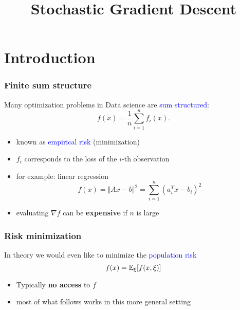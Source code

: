 \documentclass[aspectratio=149]{beamer}
\title{Stochastic Gradient Descent}
\begin{document}
\maketitle
{}

\section{Introduction}%
\label{sec:}

\begin{frame}
  \frametitle{Finite sum structure}

  Many optimization problems in Data science are \textcolor{blue}{sum structured}:
  \begin{equation}
    f(x) = \frac{1}{n} \sum_{i=1}^{n} f_i(x).
  \end{equation}

  \begin{itemize}
    \item known as \textcolor{blue}{empirical risk} (minimization)
    \item $f_i$ corresponds to the loss of the $i$-th observation
    \item for example: linear regression
          \begin{equation}
            f(x) = \Vert Ax-b \Vert^2 = \sum_{i=1}^{n} {(a_i^T x -b_i)}^2
          \end{equation}
    \item evaluating $\nabla f$ can be \textbf{expensive} if $n$ is large
  \end{itemize}
  
\end{frame}


\begin{frame}
  \frametitle{Risk minimization}
  In theory we would even like to minimize the \textcolor{blue}{population risk}
  \begin{equation}
    f(x) = \mathbb{E}_\xi [ f(x, \xi) ]
  \end{equation}
  \begin{itemize}
    \item Typically \textbf{no access} to $f$
    \item most of what follows works in this more general setting
  \end{itemize}
\end{frame}
\end{document}

